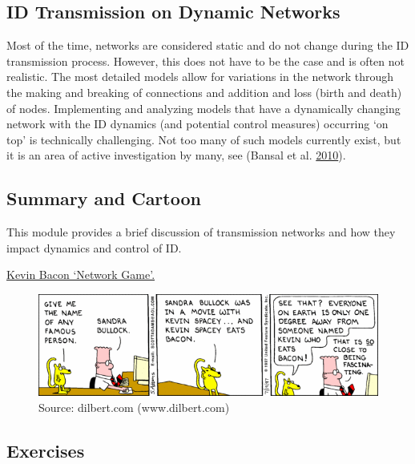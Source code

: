 \documentclass[]{article}
\theoremstyle{definition}
\theoremstyle{definition}
\theoremstyle{definition}
\theoremstyle{remark}
\begin{document}
\subsection{ID Transmission on Dynamic
Networks}\label{id-transmission-on-dynamic-networks}

Most of the time, networks are considered static and do not change
during the ID transmission process. However, this does not have to be
the case and is often not realistic. The most detailed models allow for
variations in the network through the making and breaking of connections
and addition and loss (birth and death) of nodes. Implementing and
analyzing models that have a dynamically changing network with the ID
dynamics (and potential control measures) occurring `on top' is
technically challenging. Not too many of such models currently exist,
but it is an area of active investigation by many, see (Bansal et al.
\protect\hyperlink{ref-bansal10}{2010}).

\subsection{Summary and Cartoon}\label{summary-and-cartoon-13}

This module provides a brief discussion of transmission networks and how
they impact dynamics and control of ID.

\href{https://en.wikipedia.org/wiki/Six_Degrees_of_Kevin_Bacon}{Kevin
Bacon `Network Game'.}

\begin{figure}
\centering
\includegraphics{./images/dilbert_degreesofseparation.gif}
\caption{Source: dilbert.com (www.dilbert.com)}
\end{figure}

\subsection{Exercises}\label{exercises-13}
\end{document}

